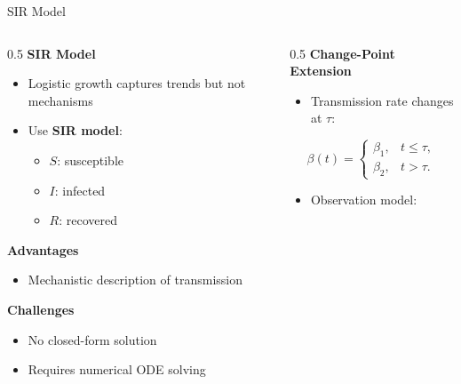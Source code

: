 \documentclass[
  ignorenonframetext,
  aspectratio=169,
]{beamer}
\providecommand{\tightlist}{%
  \setlength{\itemsep}{0pt}\setlength{\parskip}{0pt}}\usepackage{longtable,booktabs,array}
\begin{document}
\begin{frame}{SIR Model}
\begin{columns}[T]
\begin{column}{0.5\textwidth}
\textbf{SIR Model}

\begin{itemize}
\item
  Logistic growth captures trends but not mechanisms\\
\item
  Use \textbf{SIR model}:

  \begin{itemize}
  \tightlist
  \item
    \(S\): susceptible\\
  \item
    \(I\): infected\\
  \item
    \(R\): recovered
  \end{itemize}
\end{itemize}

\textbf{Advantages}

\begin{itemize}
\tightlist
\item
  Mechanistic description of transmission
\end{itemize}

\textbf{Challenges}

\begin{itemize}
\tightlist
\item
  No closed-form solution\\
\item
  Requires numerical ODE solving
\end{itemize}
\end{column}

\begin{column}{0.5\textwidth}
\textbf{Change-Point Extension}

\begin{itemize}
\tightlist
\item
  Transmission rate changes at \(\tau\):
\end{itemize}

\vspace{-8pt}

\[
\beta(t)=
\begin{cases}
\beta_1, & t \le \tau,\\
\beta_2, & t > \tau.
\end{cases}
\]

\begin{itemize}
\tightlist
\item
  Observation model:
\end{itemize}


\end{column}
\end{columns}
\end{frame}
\end{document}

